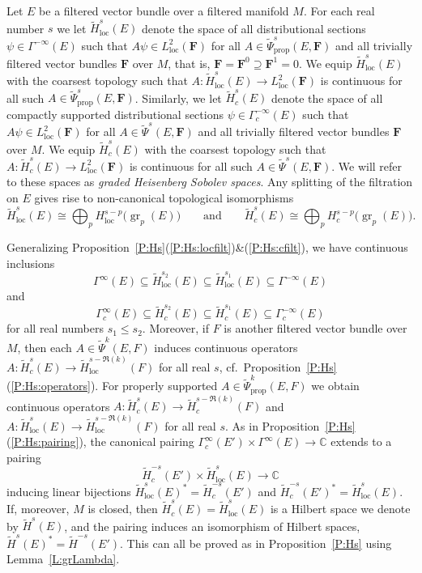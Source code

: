 \documentclass[reqno,12pt]{amsart}
\DeclareMathOperator{\gr}{gr}
\newcommand\C{\mathbb C}
\newcommand\prop{\textrm{prop}}
\newcommand\loc{\textrm{loc}}
\newcommand\itemref[1]{(\ref{#1})}
\theoremstyle{plain}
\theoremstyle{definition}
\begin{document}
Let $E$ be a filtered vector bundle over a filtered manifold $M$.
For each real number $s$ we let $\tilde H^s_\loc(E)$ denote the space of all distributional sections $\psi\in\Gamma^{-\infty}(E)$ such that $A\psi\in L^2_\loc(\mathbf F)$ for all $A\in\tilde\Psi^s_\prop(E,\mathbf F)$ and all trivially filtered vector bundles $\mathbf F$ over $M$, that is, $\mathbf F=\mathbf F^0\supseteq\mathbf F^1=0$.
We equip $\tilde H^s_\loc(E)$ with the coarsest topology such that $A\colon\tilde H^s_\loc(E)\to L^2_\loc(\mathbf F)$ is continuous for all such $A\in\tilde\Psi^s_\prop(E,\mathbf F)$.
Similarly, we let $\tilde H^s_c(E)$ denote the space of all compactly supported distributional sections $\psi\in\Gamma_c^{-\infty}(E)$ such that $A\psi\in L^2_\loc(\mathbf F)$ for all $A\in\tilde\Psi^s(E,\mathbf F)$ and all trivially filtered vector bundles $\mathbf F$ over $M$.
We equip $\tilde H^s_c(E)$ with the coarsest topology such that $A\colon\tilde H^s_c(E)\to L^2_\loc(\mathbf F)$ is continuous for all such $A\in\tilde\Psi^s(E,\mathbf F)$.
We will refer to these spaces as \emph{graded Heisenberg Sobolev spaces}.
Any splitting of the filtration on $E$ gives rise to non-canonical topological isomorphisms
$$
\tilde H^s_\loc(E)\cong\bigoplus_p H^{s-p}_\loc\bigl(\gr_p(E)\bigr)
\qquad\text{and}\qquad
\tilde H^s_c(E)\cong\bigoplus_pH^{s-p}_c\bigl(\gr_p(E)\bigr).
$$


Generalizing Proposition~\ref{P:Hs}\itemref{P:Hs:locfilt}\&\itemref{P:Hs:cfilt}, we have continuous inclusions
$$
\Gamma^\infty(E)\subseteq\tilde H^{s_2}_\loc(E)\subseteq\tilde H^{s_1}_\loc(E)\subseteq\Gamma^{-\infty}(E)
$$
and
$$
\Gamma^\infty_c(E)\subseteq\tilde H^{s_2}_c(E)\subseteq\tilde H^{s_1}_c(E)\subseteq\Gamma_c^{-\infty}(E)
$$
for all real numbers $s_1\leq s_2$.
Moreover, if $F$ is another filtered vector bundle over $M$, then each $A\in\tilde\Psi^k(E,F)$ induces continuous operators $A\colon\tilde H^s_c(E)\to\tilde H_\loc^{s-\Re(k)}(F)$ for all real $s$, cf.\ Proposition~\ref{P:Hs}\itemref{P:Hs:operators}.
For properly supported $A\in\tilde\Psi^k_\prop(E,F)$ we obtain continuous operators $A\colon\tilde H^s_c(E)\to\tilde H_c^{s-\Re(k)}(F)$ and $A\colon\tilde H^s_\loc(E)\to\tilde H_\loc^{s-\Re(k)}(F)$ for all real $s$.
As in Proposition~\ref{P:Hs}\itemref{P:Hs:pairing}, the canonical pairing $\Gamma^\infty_c(E')\times\Gamma^\infty(E)\to\C$ extends to a pairing
$$
\tilde H^{-s}_c(E')\times\tilde H^s_\loc(E)\to\C
$$
inducing linear bijections $\tilde H^s_\loc(E)^*=\tilde H^{-s}_c(E')$ and $\tilde H^{-s}_c(E')^*=\tilde H^s_\loc(E)$.
If, moreover, $M$ is closed, then $\tilde H^s_c(E)=\tilde H^s_\loc(E)$ is a Hilbert space we denote by $\tilde H^s(E)$, and the pairing induces an isomorphism of Hilbert spaces, $\tilde H^s(E)^*=\tilde H^{-s}(E')$.
This can all be proved as in Proposition~\ref{P:Hs} using Lemma~\ref{L:grLambda}.
\end{document}
